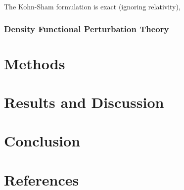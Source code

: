 \documentclass[12pt]{article}
\begin{document}
The Kohn-Sham formulation is exact (ignoring relativity), 
\subsubsection{Density Functional Perturbation Theory}

\section{Methods}
\begin{figure}
	
\end{figure}

\section{Results and Discussion}

\section{Conclusion}

\section{References}





\appendix
\end{document}
